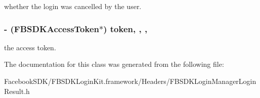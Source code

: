 whether the login was cancelled by the user. \hypertarget{interface_f_b_s_d_k_login_manager_login_result_a5140b7c91559db23ec845ffb20369dc9}{
\subsubsection[{token}]{\setlength{\rightskip}{0pt plus 5cm}-\/ ({\bf F\-B\-S\-D\-K\-Access\-Token}$\ast$) token\hspace{0.3cm}{\ttfamily [read]}, {\ttfamily [write]}, {\ttfamily [nonatomic]}, {\ttfamily [copy]}}}\label{interface_f_b_s_d_k_login_manager_login_result_a5140b7c91559db23ec845ffb20369dc9}
the access token. 

The documentation for this class was generated from the following file\-:\begin{DoxyCompactItemize}
\item 
Facebook\-S\-D\-K/\-F\-B\-S\-D\-K\-Login\-Kit.\-framework/\-Headers/F\-B\-S\-D\-K\-Login\-Manager\-Login\-Result.\-h\end{DoxyCompactItemize}
